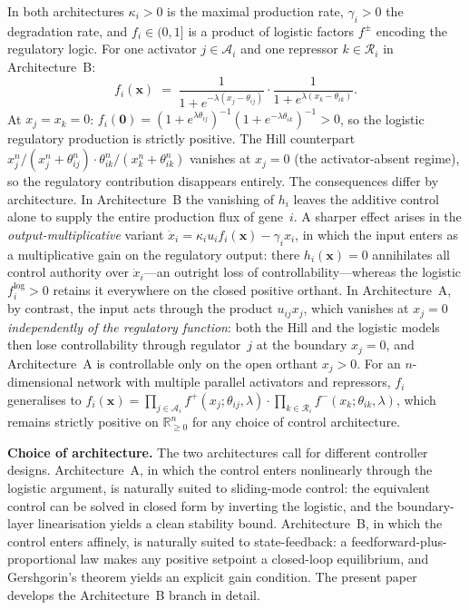 \documentclass[12pt]{article}
\begin{document}
\smallskip
In both architectures $\kappa_i>0$ is the maximal production rate, $\gamma_i>0$
the degradation rate, and $f_i\in (0,1]$ is a product of logistic factors
$f^\pm$ encoding the regulatory logic. For one activator
$j\in\mathcal{A}_i$ and one repressor $k\in\mathcal{R}_i$ in Architecture~B:
\begin{equation}
f_i(\mathbf{x}) \;=\;
\frac{1}{1+e^{-\lambda(x_j-\theta_{ij})}}\cdot
\frac{1}{1+e^{\lambda(x_k-\theta_{ik})}}.
\label{eq:fi-AR}
\end{equation}
At $x_j=x_k=0$:
$f_i(\mathbf 0) = (1+e^{\lambda\theta_{ij}})^{-1}(1+e^{-\lambda\theta_{ik}})^{-1}>0$,
so the logistic regulatory production is strictly positive. The Hill counterpart
$x_j^n/(x_j^n+\theta_{ij}^n)\cdot \theta_{ik}^n/(x_k^n+\theta_{ik}^n)$ vanishes
at $x_j=0$ (the activator-absent regime), so the regulatory contribution
disappears entirely. The consequences differ by architecture. In
Architecture~B the vanishing of $h_i$ leaves the additive control alone to
supply the entire production flux of gene~$i$. A sharper effect arises in the
\emph{output-multiplicative} variant
$\dot{x}_i=\kappa_i u_i f_i(\mathbf{x})-\gamma_i x_i$, in which the input
enters as a multiplicative gain on the regulatory output: there
$h_i(\mathbf{x})=0$ annihilates all control authority over $\dot{x}_i$---an
outright loss of controllability---whereas the logistic $f_i^{\mathrm{log}}>0$
retains it everywhere on the closed positive orthant. In Architecture~A, by
contrast, the input acts through the product $u_{ij}x_j$, which vanishes at
$x_j=0$ \emph{independently of the regulatory function}: both the Hill and the
logistic models then lose controllability through regulator~$j$ at the
boundary $x_j=0$, and Architecture~A is controllable only on the open orthant
$x_j>0$. For an $n$-dimensional network with multiple parallel activators and
repressors, $f_i$ generalises to
$f_i(\mathbf{x}) =
\prod_{j\in\mathcal{A}_i} f^+(x_j;\theta_{ij},\lambda)
\cdot
\prod_{k\in\mathcal{R}_i} f^-(x_k;\theta_{ik},\lambda)$,
which remains strictly positive on $\mathbb{R}_{\geq 0}^n$ for any choice of
control architecture.

\smallskip
\noindent\textbf{Choice of architecture.}\;
The two architectures call for different controller designs.
Architecture~A, in which the control enters nonlinearly through the
logistic argument, is naturally suited to sliding-mode control: the equivalent
control can be solved in closed form by inverting the logistic, and
the boundary-layer linearisation yields a clean stability bound.
Architecture~B, in which the control enters affinely, is naturally
suited to state-feedback: a feedforward-plus-proportional law makes
any positive setpoint a closed-loop equilibrium, and Gershgorin's
theorem yields an explicit gain condition. The present paper develops
the Architecture~B branch in detail.
\end{document}
